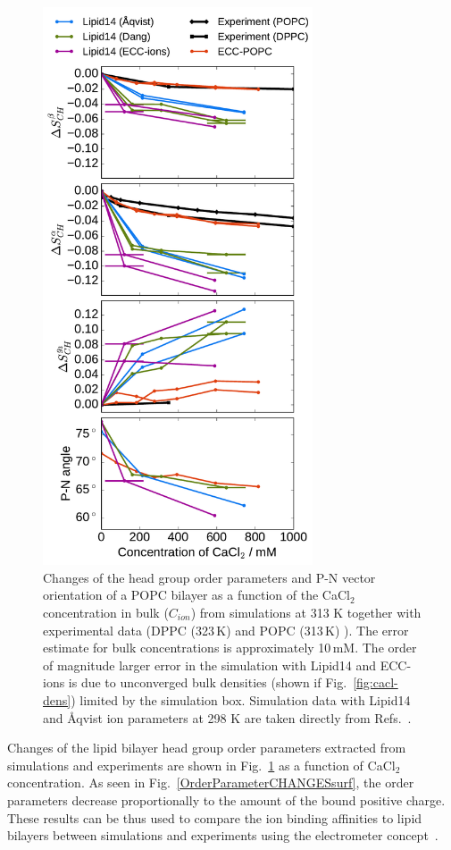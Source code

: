 \begin{figure}[htb!] 
  \centering 
  \includegraphics[width=8.0cm]{../img/ecc_popc/PN_angle_OrdPars-A-B-g3_L14-ECCL17_q80_sig89_CaCl.pdf} 
  \caption{\label{fig:delta_ordPar_CaCl} 
    Changes of the head group order parameters and P-N vector orientation of a POPC bilayer  
    as a function of the CaCl$_2$ concentration in bulk ($C_{ion}$) 
    from simulations at 313 K together with experimental data  
    (DPPC (323\,K) \citep{akutsu81} and POPC (313\,K) \citep{altenbach84}).  
    The error estimate for bulk concentrations is approximately 10\,mM. 
    The order of magnitude larger error in the
    simulation with Lipid14 and ECC-ions is due to unconverged bulk densities  (shown if Fig.~\ref{fig:cacl-dens}) limited by
    the simulation box.  
    Simulation data with Lipid14 and Åqvist ion parameters at 298 K are taken directly from 
    Refs.~\citep{lipid14POPC0mMNaClfiles,lipid14POPC350mMCaClfiles,lipid14POPC350mMCaClfilesNC}. 
  } 
\end{figure} 


Changes of the lipid bilayer head group order parameters extracted from simulations and 
experiments \citep{akutsu81, altenbach84} are shown in Fig.~\ref{fig:delta_ordPar_CaCl} 
as a function of CaCl$_2$ concentration. 
As seen in Fig.~\ref{OrderParameterCHANGESsurf}, the order parameters decrease 
proportionally to the amount of the bound positive charge. 
These results can be thus used to compare the ion binding affinities to lipid bilayers between 
simulations and experiments using the electrometer concept~\citep{seelig87, catte16}. 

